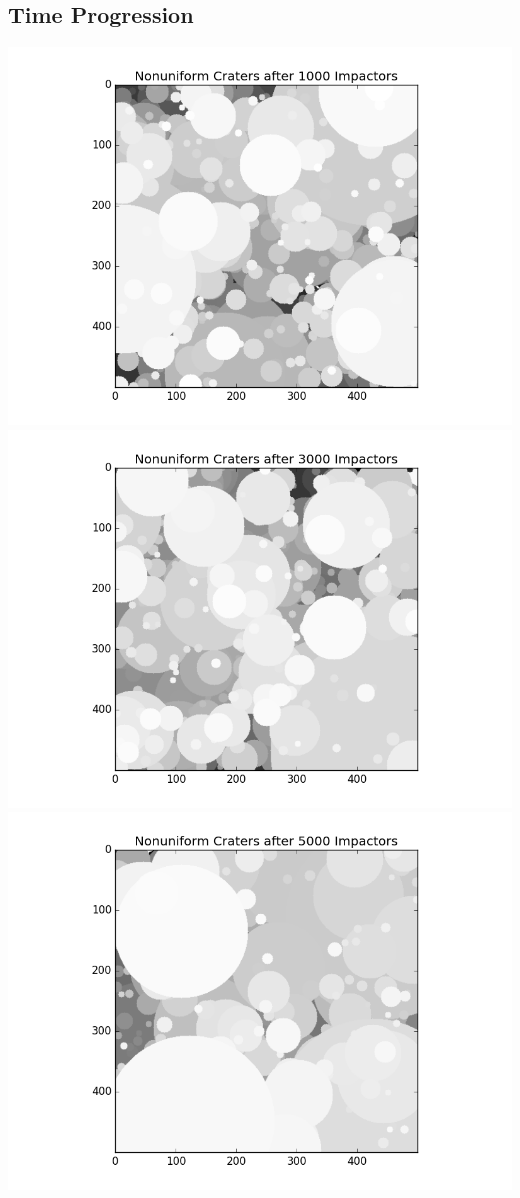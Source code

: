 \documentclass[11pt]{article}
\begin{document}
\subsection{Time Progression}
\includegraphics[scale=.4]{NonUniform1.png}
\includegraphics[scale=.4]{NonUniform3.png}\\
\includegraphics[scale=.4]{NonUniform5.png}
\end{document}
